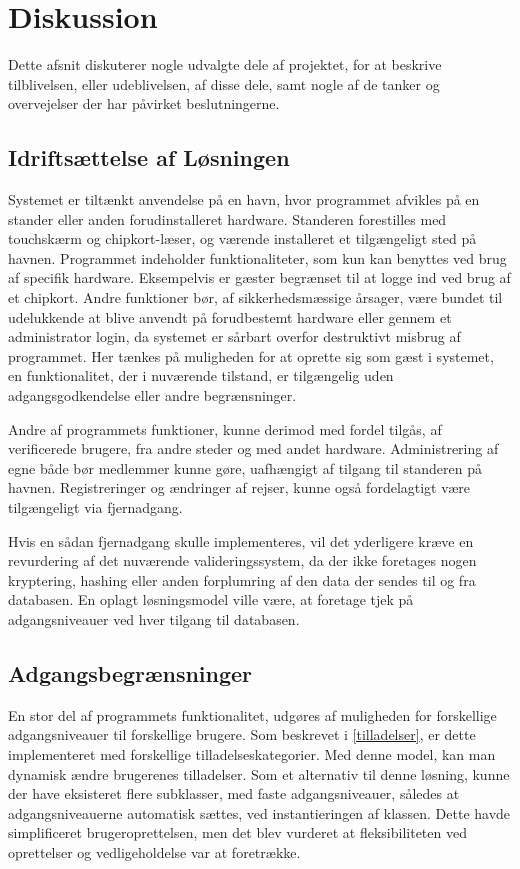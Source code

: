 \chapter{Diskussion}
\label{cha:diskussion}

Dette afsnit diskuterer nogle udvalgte dele af projektet, for at beskrive tilblivelsen, eller udeblivelsen, af disse dele, samt nogle af de tanker og overvejelser der har påvirket beslutningerne.

\section{Idriftsættelse af Løsningen} 

Systemet er tiltænkt anvendelse på en havn, hvor programmet afvikles på en stander eller anden forudinstalleret hardware. Standeren forestilles med touchskærm og chipkort-læser, og værende installeret et tilgængeligt sted på havnen. Programmet indeholder funktionaliteter, som kun kan benyttes ved brug af specifik hardware. Eksempelvis er gæster begrænset til at logge ind ved brug af et chipkort. Andre funktioner bør, af sikkerhedsmæssige årsager, være bundet til udelukkende at blive anvendt på forudbestemt hardware eller gennem et administrator login, da systemet er sårbart overfor destruktivt misbrug af programmet. Her tænkes på muligheden for at oprette sig som gæst i systemet, en funktionalitet, der i nuværende tilstand, er tilgængelig uden adgangsgodkendelse eller andre begrænsninger.

Andre af programmets funktioner, kunne derimod med fordel tilgås, af verificerede brugere, fra andre steder og med andet hardware. Administrering af egne både bør medlemmer kunne gøre, uafhængigt af tilgang til standeren på havnen. Registreringer og ændringer af rejser, kunne også fordelagtigt være tilgængeligt via fjernadgang.

Hvis en sådan fjernadgang skulle implementeres, vil det yderligere kræve en revurdering af det nuværende valideringssystem, da der ikke foretages nogen kryptering, hashing eller anden forplumring af den data der sendes til og fra databasen. En oplagt løsningsmodel ville være, at foretage tjek på adgangsniveauer ved hver tilgang til databasen.

\section{Adgangsbegrænsninger}

En stor del af programmets funktionalitet, udgøres af muligheden for forskellige adgangsniveauer til forskellige brugere. Som beskrevet i \cref{tilladelser}, er dette implementeret med forskellige tilladelseskategorier. Med denne model, kan man dynamisk ændre brugerenes tilladelser. Som et alternativ til denne løsning, kunne der have eksisteret flere subklasser, med faste adgangsniveauer, således at adgangsniveauerne automatisk sættes, ved instantieringen af klassen. Dette havde simplificeret brugeroprettelsen, men det blev vurderet at fleksibiliteten ved oprettelser og vedligeholdelse var at foretrække. 

